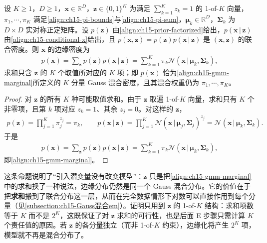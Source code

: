 \documentclass[../../main.tex]{subfiles}
\begin{document}
\begin{proposition}[边缘化恢复混合分布]\label{proposition:ch15-边缘化}
设 $K\geqslant1$，$D\geqslant1$，$\bm{x}\in\mathbb{R}^{D}$，$\bm{z}\in\{0,1\}^{K}$ 为满足 $\sum_{k=1}^{K}z_k=1$ 的 1-of-$K$ 向量，$\pi_1,\cdots,\pi_K$ 满足\eqref{align:ch15-pi-bounds}与\eqref{align:ch15-pi-sum}，$\bm{\mu}_k\in\mathbb{R}^{D}$，$\bm{\Sigma}_k$ 为 $D\times D$ 实对称正定矩阵。设 $p(\bm{z})$ 由\eqref{align:ch15-prior-factorized}给出，$p(\bm{x}\,|\,\bm{z})$ 由\eqref{align:ch15-conditional-x}给出，且 $p(\bm{x},\bm{z})=p(\bm{z})p(\bm{x}\,|\,\bm{z})$ 是 $(\bm{x},\bm{z})$ 的联合密度。则 $\bm{x}$ 的边缘密度为
\begin{align*}
p(\bm{x})=\sum_{\bm{z}}p(\bm{z})p(\bm{x}\,|\,\bm{z})=\sum_{k=1}^{K}\pi_k\mathcal{N}(\bm{x}\,|\,\bm{\mu}_k,\bm{\Sigma}_k),
\end{align*}
求和只含 $\bm{z}$ 的 $K$ 个取值所对应的 $K$ 项；即 $p(\bm{x})$ 恰为\eqref{align:ch15-gmm-marginal}所定义的 $K$ 分量 Gauss 混合密度，且其混合权重仍为 $\pi_1,\cdots,\pi_K$。
\end{proposition}
\begin{proof}
对 $\bm{z}$ 的所有 $K$ 种可能取值求和。由于 $\bm{z}$ 取遍 1-of-$K$ 向量，求和只有 $K$ 个非零项，且第 $k$ 项对应 $z_k=1$、其余 $z_j=0$。对这样的 $\bm{z}$，
\begin{align*}
p(\bm{z})=\prod_{j=1}^{K}\pi_j^{z_j}=\pi_k,\qquad
p(\bm{x}\,|\,\bm{z})=\prod_{j=1}^{K}\mathcal{N}(\bm{x}\,|\,\bm{\mu}_j,\bm{\Sigma}_j)^{z_j}=\mathcal{N}(\bm{x}\,|\,\bm{\mu}_k,\bm{\Sigma}_k).
\end{align*}
于是
\begin{align*}
p(\bm{x})=\sum_{\bm{z}}p(\bm{z})p(\bm{x}\,|\,\bm{z})=\sum_{k=1}^{K}\pi_k\mathcal{N}(\bm{x}\,|\,\bm{\mu}_k,\bm{\Sigma}_k),
\end{align*}
即\eqref{align:ch15-gmm-marginal}。
\end{proof}

\begin{remark}
这条命题说明了“引入潜变量没有改变模型”：$\bm{z}$ 只是把\eqref{align:ch15-gmm-marginal}中的求和换了一种说法，边缘分布仍然是同一个 Gauss 混合分布。它的价值在于把\textbf{求和}搬到了联合分布这一层，从而在完全数据情形下对数可以直接作用到每个分量（见\cref{subsection:ch15-Gauss混合em}）。证明只用到 $\bm{z}$ 的 1-of-$K$ 结构：求和项数等于 $K$ 而不是 $2^{K}$，这既保证了对 $\bm{z}$ 求和的可行性，也是后面 E 步骤只需计算 $K$ 个责任值的原因。若 $\bm{z}$ 的各分量独立（而非 1-of-$K$ 约束），边缘化将产生 $2^{K}$ 项，模型就不再是混合分布了。
\end{remark}
\end{document}

